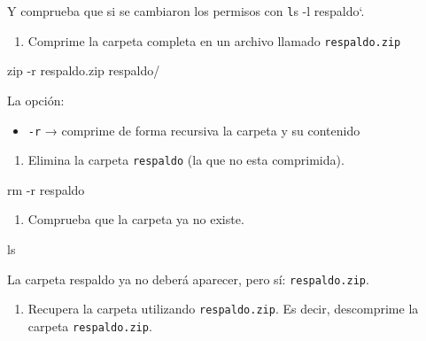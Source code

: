 \documentclass[
  spanish,
  12pt,
  letterpaper,
  DIV=11,
  numbers=noendperiod]{scrreprt}
\newenvironment{Shaded}{\begin{snugshade}}{\end{snugshade}}
\newcommand{\AttributeTok}[1]{\textcolor[rgb]{0.40,0.45,0.13}{#1}}
\newcommand{\FunctionTok}[1]{\textcolor[rgb]{0.28,0.35,0.67}{#1}}
\newcommand{\NormalTok}[1]{\textcolor[rgb]{0.00,0.23,0.31}{#1}}
\providecommand{\tightlist}{%
  \setlength{\itemsep}{0pt}\setlength{\parskip}{0pt}}
\begin{document}
\begin{tcolorbox}
Y comprueba que si se cambiaron los permisos con \texttt{l}s -l
respaldo`.

\begin{enumerate}
\def\labelenumi{\arabic{enumi}.}
\setcounter{enumi}{2}
\tightlist
\item
  Comprime la carpeta completa en un archivo llamado
  \texttt{respaldo.zip}
\end{enumerate}

\begin{Shaded}
\begin{Highlighting}[]
\FunctionTok{zip} \AttributeTok{{-}r}\NormalTok{ respaldo.zip respaldo/}
\end{Highlighting}
\end{Shaded}

La opción:

\begin{itemize}
\tightlist
\item
  \texttt{-r} → comprime de forma recursiva la carpeta y su contenido
\end{itemize}

\begin{enumerate}
\def\labelenumi{\arabic{enumi}.}
\setcounter{enumi}{3}
\tightlist
\item
  Elimina la carpeta \texttt{respaldo} (la que no esta comprimida).
\end{enumerate}

\begin{Shaded}
\begin{Highlighting}[]
\FunctionTok{rm} \AttributeTok{{-}r}\NormalTok{ respaldo}
\end{Highlighting}
\end{Shaded}

\begin{enumerate}
\def\labelenumi{\arabic{enumi}.}
\setcounter{enumi}{4}
\tightlist
\item
  Comprueba que la carpeta ya no existe.
\end{enumerate}

\begin{Shaded}
\begin{Highlighting}[]
\FunctionTok{ls}
\end{Highlighting}
\end{Shaded}

La carpeta respaldo ya no deberá aparecer, pero sí:
\texttt{respaldo.zip}.

\begin{enumerate}
\def\labelenumi{\arabic{enumi}.}
\setcounter{enumi}{5}
\tightlist
\item
  Recupera la carpeta utilizando \texttt{respaldo.zip}. Es decir,
  descomprime la carpeta \texttt{respaldo.zip}.
\end{enumerate}


\end{tcolorbox}
\end{document}
